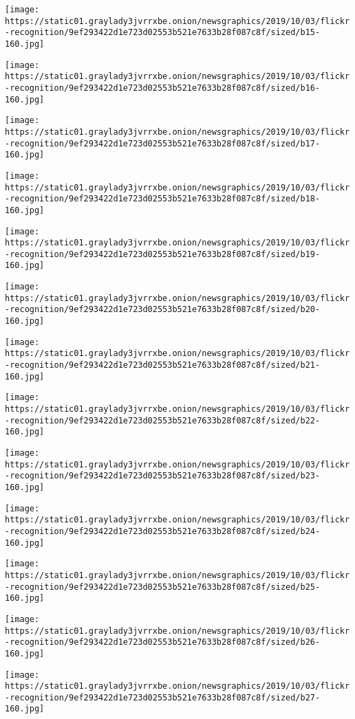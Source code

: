 \texttt{[image: https://static01.graylady3jvrrxbe.onion/newsgraphics/2019/10/03/flickr-recognition/9ef293422d1e723d02553b521e7633b28f087c8f/sized/b15-160.jpg]}

\texttt{[image: https://static01.graylady3jvrrxbe.onion/newsgraphics/2019/10/03/flickr-recognition/9ef293422d1e723d02553b521e7633b28f087c8f/sized/b16-160.jpg]}

\texttt{[image: https://static01.graylady3jvrrxbe.onion/newsgraphics/2019/10/03/flickr-recognition/9ef293422d1e723d02553b521e7633b28f087c8f/sized/b17-160.jpg]}

\texttt{[image: https://static01.graylady3jvrrxbe.onion/newsgraphics/2019/10/03/flickr-recognition/9ef293422d1e723d02553b521e7633b28f087c8f/sized/b18-160.jpg]}

\texttt{[image: https://static01.graylady3jvrrxbe.onion/newsgraphics/2019/10/03/flickr-recognition/9ef293422d1e723d02553b521e7633b28f087c8f/sized/b19-160.jpg]}

\texttt{[image: https://static01.graylady3jvrrxbe.onion/newsgraphics/2019/10/03/flickr-recognition/9ef293422d1e723d02553b521e7633b28f087c8f/sized/b20-160.jpg]}

\texttt{[image: https://static01.graylady3jvrrxbe.onion/newsgraphics/2019/10/03/flickr-recognition/9ef293422d1e723d02553b521e7633b28f087c8f/sized/b21-160.jpg]}

\texttt{[image: https://static01.graylady3jvrrxbe.onion/newsgraphics/2019/10/03/flickr-recognition/9ef293422d1e723d02553b521e7633b28f087c8f/sized/b22-160.jpg]}

\texttt{[image: https://static01.graylady3jvrrxbe.onion/newsgraphics/2019/10/03/flickr-recognition/9ef293422d1e723d02553b521e7633b28f087c8f/sized/b23-160.jpg]}

\texttt{[image: https://static01.graylady3jvrrxbe.onion/newsgraphics/2019/10/03/flickr-recognition/9ef293422d1e723d02553b521e7633b28f087c8f/sized/b24-160.jpg]}

\texttt{[image: https://static01.graylady3jvrrxbe.onion/newsgraphics/2019/10/03/flickr-recognition/9ef293422d1e723d02553b521e7633b28f087c8f/sized/b25-160.jpg]}

\texttt{[image: https://static01.graylady3jvrrxbe.onion/newsgraphics/2019/10/03/flickr-recognition/9ef293422d1e723d02553b521e7633b28f087c8f/sized/b26-160.jpg]}

\texttt{[image: https://static01.graylady3jvrrxbe.onion/newsgraphics/2019/10/03/flickr-recognition/9ef293422d1e723d02553b521e7633b28f087c8f/sized/b27-160.jpg]}

